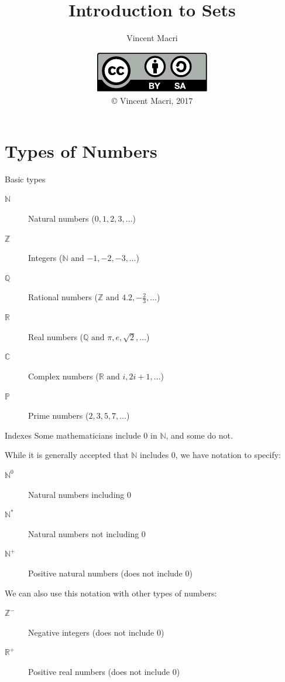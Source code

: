 

\title{Introduction to Sets}
\author{Vincent Macri}
\date{\includegraphics{../LicenseLogo}\\\copyright{} Vincent Macri, 2017}

\newcommand{\such}{\ |\ }


	\frame{\titlepage}
	\section{Types of Numbers}
	\begin{namedframe}{Basic types}
		\begin{description}
			\item[$\mathbb{N}$] Natural numbers ($0, 1, 2, 3, \dots$)
			\item[$\mathbb{Z}$] Integers ($\mathbb{N} \text{ and } {-1}, -2, -3, \dots$)
			\item[$\mathbb{Q}$] Rational numbers ($\mathbb{Z} \text{ and } 4.2, -\frac{2}{3}, \dots$)
			\item[$\mathbb{R}$] Real numbers ($\mathbb{Q} \text{ and } \pi, e, \sqrt{2}, \dots$)
			\item[$\mathbb{C}$] Complex numbers ($\mathbb{R} \text{ and } i, 2i + 1, \dots$)
			\item[$\mathbb{P}$] Prime numbers ($2, 3, 5, 7, \dots$)
		\end{description}
	\end{namedframe}
	\begin{namedframe}{Indexes}
		Some mathematicians include 0 in $\mathbb{N}$, and some do not.

		While it is generally accepted that $\mathbb{N}$ includes 0, we have notation to specify:
		\begin{description}
			\item[$\mathbb{N}^0$] Natural numbers including 0
			\item[$\mathbb{N}^*$] Natural numbers not including 0
			\item[$\mathbb{N}^+$] Positive natural numbers (does not include 0)
		\end{description}

		We can also use this notation with other types of numbers:
		\begin{description}
			\item[$\mathbb{Z}^-$] Negative integers (does not include 0)
			\item[$\mathbb{R}^+$] Positive real numbers (does not include 0)
		\end{description}
	\end{namedframe}
